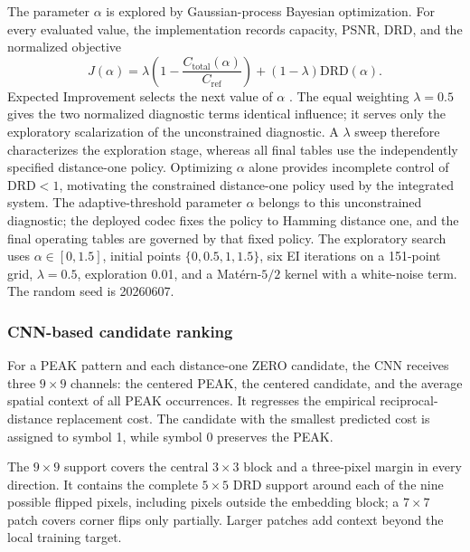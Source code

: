 \documentclass[a4paper,fleqn]{cas-dc}
\newcommand{\RevisionAddBegin}{\begingroup\color{revisionblue}}
\newcommand{\RevisionAddEnd}{\endgroup}
\begin{document}
The parameter $\alpha$ is explored by Gaussian-process Bayesian optimization.
For every evaluated value, the implementation records capacity, PSNR, DRD, and
the normalized objective
\begin{equation}
J(\alpha)=\lambda\left(1-\frac{C_{\text{total}}(\alpha)}{C_{\mathrm{ref}}}\right)
+(1-\lambda)\mathrm{DRD}(\alpha).
\label{eq:gp-objective}
\end{equation}
Expected Improvement selects the next value of $\alpha$
\cite{Frazier2018Bayesian}. The equal weighting
$\lambda=0.5$ gives the two normalized diagnostic terms identical influence;
\RevisionAddBegin
it serves only the exploratory scalarization of the unconstrained diagnostic.
A $\lambda$ sweep therefore characterizes the exploration stage, whereas all
final tables use the independently specified distance-one policy. Optimizing
$\alpha$ alone provides incomplete control of
\RevisionAddEnd
$\mathrm{DRD}<1$, motivating the constrained distance-one policy used by the
\RevisionAddBegin
integrated system. The adaptive-threshold parameter $\alpha$ belongs to this
unconstrained diagnostic; the deployed codec fixes the policy to Hamming
distance one, and the final operating tables are governed by that fixed policy.
The exploratory search uses
\RevisionAddEnd
$\alpha\in[0,1.5]$, initial points $\{0,0.5,1,1.5\}$, six EI iterations on a
\RevisionAddBegin
151-point grid, $\lambda=0.5$, exploration 0.01, and a Mat\'ern-$5/2$ kernel
\RevisionAddEnd
with a white-noise term. The random seed is 20260607.

\subsubsection*{CNN-based candidate ranking}

For a PEAK pattern and each distance-one ZERO candidate, the CNN receives three
\RevisionAddBegin
$9\times9$ channels: the centered PEAK, the centered candidate, and the average
\RevisionAddEnd
spatial context of all PEAK occurrences. It regresses the empirical
reciprocal-distance replacement cost. The candidate with the smallest predicted
\RevisionAddBegin
cost is assigned to symbol 1, while symbol 0 preserves the PEAK.
\RevisionAddEnd

The $9\times9$ support covers the central $3\times3$ block and a three-pixel
margin in every direction. It contains the complete $5\times5$ DRD support
around each of the nine possible flipped pixels, including pixels outside the
\RevisionAddBegin
embedding block; a $7\times7$ patch covers corner flips only partially.
Larger patches add context beyond the local training target.
\RevisionAddEnd
\end{document}
